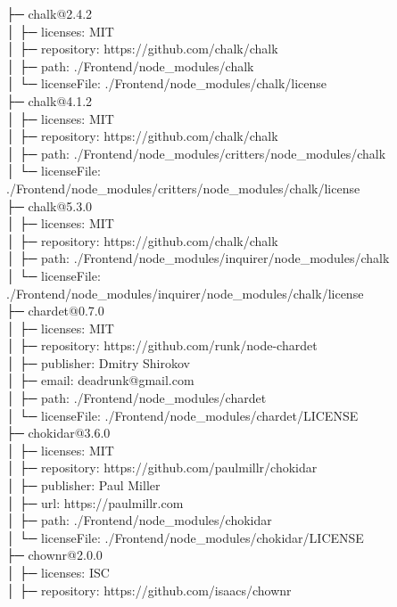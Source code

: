 ├─ chalk@2.4.2\\
│  ├─ licenses: MIT\\
│  ├─ repository: https://github.com/chalk/chalk\\
│  ├─ path: ./Frontend/node\_modules/chalk\\
│  └─ licenseFile: ./Frontend/node\_modules/chalk/license\\
├─ chalk@4.1.2\\
│  ├─ licenses: MIT\\
│  ├─ repository: https://github.com/chalk/chalk\\
│  ├─ path: ./Frontend/node\_modules/critters/node\_modules/chalk\\
│  └─ licenseFile: ./Frontend/node\_modules/critters/node\_modules/chalk/license\\
├─ chalk@5.3.0\\
│  ├─ licenses: MIT\\
│  ├─ repository: https://github.com/chalk/chalk\\
│  ├─ path: ./Frontend/node\_modules/inquirer/node\_modules/chalk\\
│  └─ licenseFile: ./Frontend/node\_modules/inquirer/node\_modules/chalk/license\\
├─ chardet@0.7.0\\
│  ├─ licenses: MIT\\
│  ├─ repository: https://github.com/runk/node-chardet\\
│  ├─ publisher: Dmitry Shirokov\\
│  ├─ email: deadrunk@gmail.com\\
│  ├─ path: ./Frontend/node\_modules/chardet\\
│  └─ licenseFile: ./Frontend/node\_modules/chardet/LICENSE\\
├─ chokidar@3.6.0\\
│  ├─ licenses: MIT\\
│  ├─ repository: https://github.com/paulmillr/chokidar\\
│  ├─ publisher: Paul Miller\\
│  ├─ url: https://paulmillr.com\\
│  ├─ path: ./Frontend/node\_modules/chokidar\\
│  └─ licenseFile: ./Frontend/node\_modules/chokidar/LICENSE\\
├─ chownr@2.0.0\\
│  ├─ licenses: ISC\\
│  ├─ repository: https://github.com/isaacs/chownr\\

